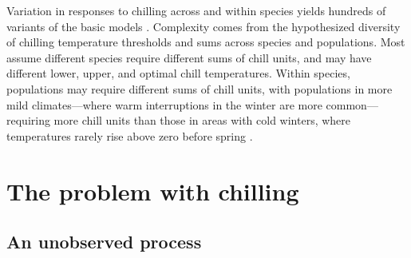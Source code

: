 \documentclass[11pt]{article}
\begin{document}
Variation in responses to chilling across and within species yields hundreds of variants of the basic models \citep[][]{basler2016evaluating,hufkens2018integrated}. Complexity comes from the hypothesized diversity of chilling temperature thresholds and sums across species and populations. Most assume different species require different sums of chill units, and may have different lower, upper, and optimal chill temperatures. Within species, populations may require different sums of chill units, with populations in more mild climates---where warm interruptions in the winter are more common---requiring more chill units than those in areas with cold winters, where temperatures rarely rise above zero before spring \citep{campbell1979,leinonen1996dependence}.  

\section*{The problem with chilling}

\subsection*{An unobserved process}
\end{document}
